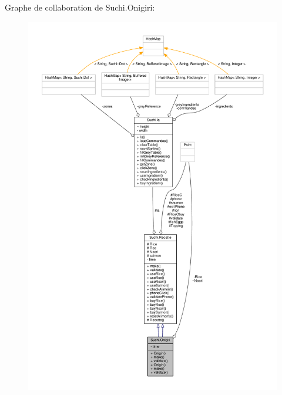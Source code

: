 Graphe de collaboration de Suchi.\+Onigiri\+:\nopagebreak
\begin{figure}[H]
\begin{center}
\leavevmode
\includegraphics[width=350pt]{classSuchi_1_1Onigiri__coll__graph}
\end{center}
\end{figure}
